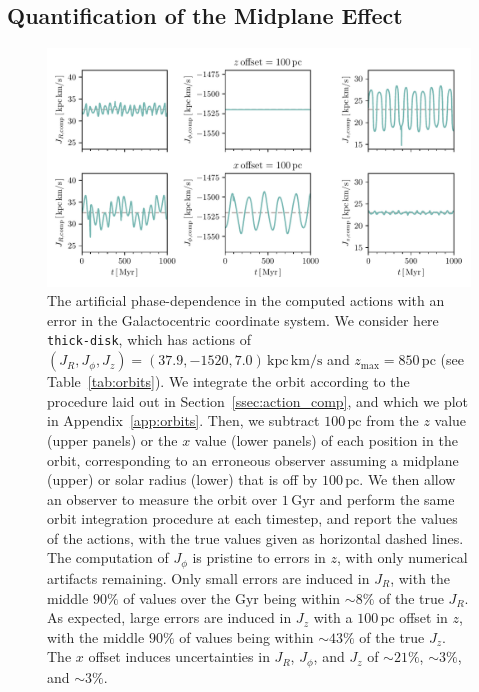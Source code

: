 \documentclass[twocolumn]{aastex62}
\newcommand{\pc}{\text{pc}}
\newcommand{\Gyr}{\text{Gyr}}
\newcommand{\kms}{\text{km}/\text{s}}
\newcommand{\actunit}{\text{kpc}\,\kms}
\newcommand{\thick}{\texttt{thick-disk}}
\begin{document}
\subsection{Quantification of the Midplane Effect} \label{ssec:quant}

\begin{figure}[ht!]
\begin{center}
\includegraphics[width=\textwidth]{fig/schmactions_one_orbit.pdf}
\end{center}
\caption{The artificial phase-dependence in the computed actions with an
error in the Galactocentric coordinate system. We consider here \thick{},
which has actions of $(J_R, J_{\phi}, J_z) = (37.9, -1520,
7.0)\,\actunit$ and $z_{\text{max}}=850\,\pc$ (see Table~\ref{tab:orbits}). We
integrate the orbit according to the procedure laid out in
Section~\ref{ssec:action_comp}, and which we plot in
Appendix~\ref{app:orbits}. Then, we subtract $100\,\pc$ from the $z$ value
(upper panels) or the $x$ value (lower panels) of each position in the orbit,
corresponding to an erroneous observer assuming a midplane (upper) or solar
radius (lower) that is off by $100\,\pc$. We then allow an observer
to measure the orbit over $1\,\Gyr$ and perform the same orbit integration
procedure at each timestep, and report the values of the actions, with the true values given as horizontal dashed lines. The
computation of $J_{\phi}$ is pristine to errors in $z$, with only numerical
artifacts remaining. Only small errors are induced in $J_R$, with the middle
$90\%$ of values over the $\Gyr$ being within $\sim8\%$ of the true $J_R$. As
expected, large errors are induced in $J_z$ with a $100\,\pc$ offset in $z$,
with the middle $90\%$ of values being within $\sim43\%$ of the true $J_z$.
The $x$ offset induces uncertainties in $J_R$, $J_{\phi}$, and $J_z$ of
$\sim21\%$, $\sim3\%$, and $\sim3\%$.}
\label{fig:one_orbit_wrong_ref}
\end{figure}
\end{document}
